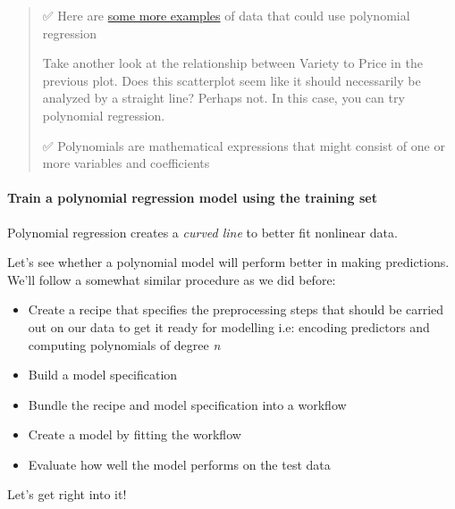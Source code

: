\documentclass[
]{article}
\begin{document}
\begin{quote}
✅ Here are \href{https://online.stat.psu.edu/stat501/lesson/9/9.8}{some
more examples} of data that could use polynomial regression

Take another look at the relationship between Variety to Price in the
previous plot. Does this scatterplot seem like it should necessarily be
analyzed by a straight line? Perhaps not. In this case, you can try
polynomial regression.

✅ Polynomials are mathematical expressions that might consist of one or
more variables and coefficients
\end{quote}

\hypertarget{train-a-polynomial-regression-model-using-the-training-set}{%
\paragraph{Train a polynomial regression model using the training
set}\label{train-a-polynomial-regression-model-using-the-training-set}}

Polynomial regression creates a \emph{curved line} to better fit
nonlinear data.

Let's see whether a polynomial model will perform better in making
predictions. We'll follow a somewhat similar procedure as we did before:

\begin{itemize}
\item
  Create a recipe that specifies the preprocessing steps that should be
  carried out on our data to get it ready for modelling i.e: encoding
  predictors and computing polynomials of degree \emph{n}
\item
  Build a model specification
\item
  Bundle the recipe and model specification into a workflow
\item
  Create a model by fitting the workflow
\item
  Evaluate how well the model performs on the test data
\end{itemize}

Let's get right into it!
\end{document}
